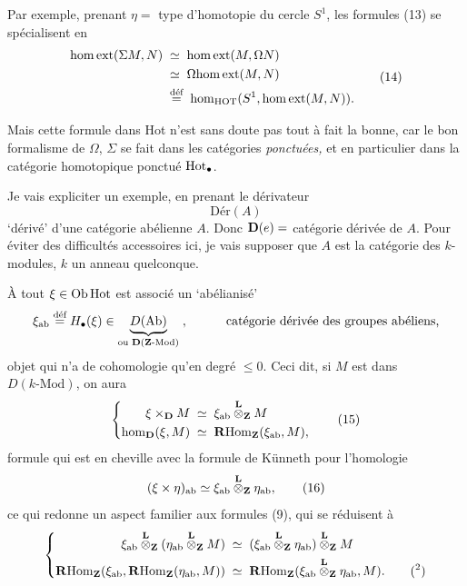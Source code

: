 
Par exemple, prenant $\eta=$ type d’homotopie du cercle $S^1$, les formules (13) se spécialisent en
\[
\begin{aligned}
\homext(\Sigma M,N) &\;\simeq\;\homext(M,\Omega N)\\
&\;\simeq\;\Omega\homext(M,N)\\
&\;\defeq\;\hm_{\HOT}(S^1,\homext(M,N)).
\end{aligned}
\tag*{(14)}
\]

Mais cette formule dans Hot n’est sans doute pas tout à fait la bonne, car le bon formalisme de $\Omega$, $\Sigma$ se fait dans les catégories \textit{ponctuées,} et en particulier dans la catégorie homotopique ponctué $\mathrm{Hot}_{\bullet}$. %

Je vais expliciter un exemple, en prenant le dérivateur
\[
\mathrm{Dér}(A)
\]
‘dérivé’ d’une catégorie abélienne $A$. Donc $\mathbf{D}(e)=$ catégorie dérivée de $A$. Pour éviter des
difficultés accessoires ici, je vais supposer que $A$ est la catégorie des $k$-modules, $k$ un anneau quelconque.

À tout $\xi\in\mathrm{Ob}\,\mathrm{Hot}$ est associé un ‘abélianisé’
\[
\xi_{\mathrm{ab}}\overset{\text{déf}}{=} H_{\bullet}(\xi)\in\underbrace{D(\mathrm{Ab})}_{\text{ou }\mathbf{D}(\mathbf{Z}\text{-Mod})}\;,\qquad\quad\text{catégorie dérivée des groupes abéliens,}
\]
objet qui n’a de cohomologie qu’en degré $\le 0$. Ceci dit, si $M$ est dans $D(k\text{-Mod})$, on aura
\[
\left\{
\begin{aligned}
\xi\times_{\D}M &\;\simeq\;\xi_{\ab}\Ltens_{\mathbf{Z}}M\\
\hm_{\D}(\xi,M) &\;\simeq\;\RHom_{\mathbf{Z}}(\xi_{\ab},M),
\end{aligned}
\right.
\tag*{(15)}
\]
formule qui est en cheville avec la formule de Künneth pour l’homologie
\[
(\xi\times\eta)_{\ab}\simeq\xi_{\ab}\Ltens_{\mathbf{Z}}\eta_{\ab},
\tag*{(16)}
\]
ce qui redonne un aspect familier aux formules (9), qui se réduisent à
\[
\left\{
\begin{aligned}
\xi_{\ab}\Ltens_{\mathbf{Z}}(\eta_{\ab}\Ltens_{\mathbf{Z}}M) &\;\simeq\;(\xi_{\ab}\Ltens_{\mathbf{Z}}\eta_{\ab})\Ltens_{\mathbf{Z}}M\\
\RHom_{\mathbf{Z}}(\xi_{\ab},\RHom_{\mathbf{Z}}(\eta_{\ab},M)) &\;\simeq\;\RHom_{\mathbf{Z}}(\xi_{\ab}\Ltens_{\mathbf{Z}}\eta_{\ab},M).\qquad\text{(\footnotemark[2])}
\end{aligned}
\right.
\]

